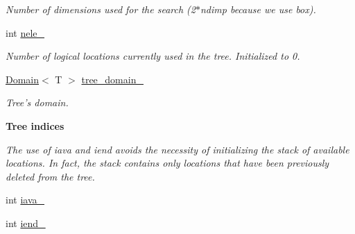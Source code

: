 \begin{DoxyCompactItemize}
\begin{DoxyCompactList}\small\item\em Number of dimensions used for the search (2$\ast$ndimp because we use box). \item\end{DoxyCompactList}\item 
\hypertarget{classTree__Header_ace612fcc68b5566feff81a8e854ab1aa}{
int \hyperlink{classTree__Header_ace612fcc68b5566feff81a8e854ab1aa}{nele\_\-}}
\label{classTree__Header_ace612fcc68b5566feff81a8e854ab1aa}

\begin{DoxyCompactList}\small\item\em Number of logical locations currently used in the tree. Initialized to 0. \item\end{DoxyCompactList}\item 
\hypertarget{classTree__Header_a5ef170aea71ef926da23bcd55ede4129}{
\hyperlink{classDomain}{Domain}$<$ T $>$ \hyperlink{classTree__Header_a5ef170aea71ef926da23bcd55ede4129}{tree\_\-domain\_\-}}
\label{classTree__Header_a5ef170aea71ef926da23bcd55ede4129}

\begin{DoxyCompactList}\small\item\em Tree's domain. \item\end{DoxyCompactList}\end{DoxyCompactItemize}
\begin{Indent}{\bf Tree indices}\par
{\em \label{_amgrpca0f741e429d5e561c4e48b1890518fc}
 The use of iava and iend avoids the necessity of initializing the stack of available locations. In fact, the stack contains only locations that have been previously deleted from the tree. }\begin{DoxyCompactItemize}
\item 
int \hyperlink{classTree__Header_a106cee8ef2a9bc2b15a2ea97bc11d72b}{iava\_\-}
\item 
int \hyperlink{classTree__Header_a9f4dfb8c0a7077d7c465202d1c9c6a21}{iend\_\-}
\end{DoxyCompactItemize}
\end{Indent}
